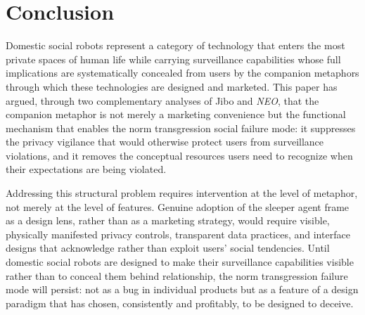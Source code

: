 \documentclass[11pt,showkeys]{../../shared/essay}
\newcommand{\neo}{\textit{NEO}}
\begin{document}
\section{Conclusion}
\label{sec:conclusion}

Domestic social robots represent a category of technology that enters the most private spaces of human life while carrying surveillance capabilities whose full implications are systematically concealed from users by the companion metaphors through which these technologies are designed and marketed. This paper has argued, through two complementary analyses of Jibo and \neo{}, that the companion metaphor is not merely a marketing convenience but the functional mechanism that enables the norm transgression social failure mode: it suppresses the privacy vigilance that would otherwise protect users from surveillance violations, and it removes the conceptual resources users need to recognize when their expectations are being violated.

Addressing this structural problem requires intervention at the level of metaphor, not merely at the level of features. Genuine adoption of the sleeper agent frame as a design lens, rather than as a marketing strategy, would require visible, physically manifested privacy controls, transparent data practices, and interface designs that acknowledge rather than exploit users' social tendencies. Until domestic social robots are designed to make their surveillance capabilities visible rather than to conceal them behind relationship, the norm transgression failure mode will persist: not as a bug in individual products but as a feature of a design paradigm that has chosen, consistently and profitably, to be designed to deceive.


\end{document}

